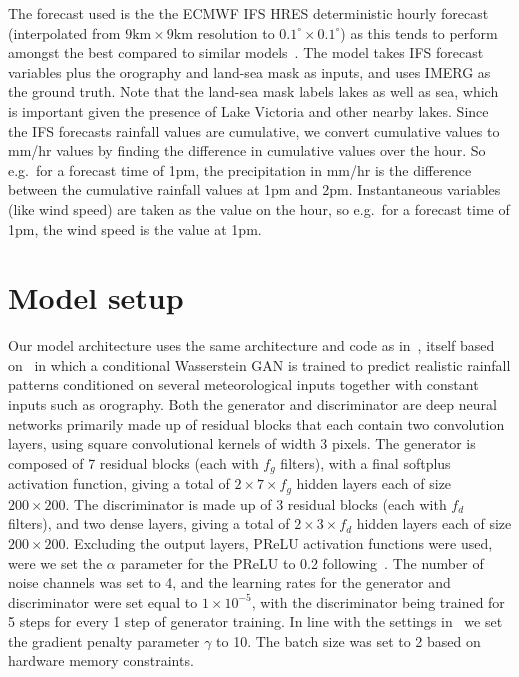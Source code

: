 \documentclass[../main.tex]{subfiles}
\begin{document}


The forecast used is the the ECMWF IFS HRES deterministic hourly forecast~\citep{ecmwf_operational_2023} (interpolated from $9\text{km} \times 9\text{km}$ resolution to $0.1^{\circ} \times 0.1^{\circ}$) as this tends to perform amongst the best compared to similar models~\citep{haiden_intercomparison_2012}. The model takes IFS forecast variables plus the orography and land-sea mask as inputs, and uses IMERG as the ground truth. Note that the land-sea mask labels lakes as well as sea, which is important given the presence of Lake Victoria and other nearby lakes. Since the IFS forecasts rainfall values are cumulative, we convert cumulative values to mm/hr values by finding the difference in cumulative values over the hour. So e.g.~for a forecast time of 1pm, the precipitation in mm/hr is the difference between the cumulative rainfall values at 1pm and 2pm. Instantaneous variables (like wind speed) are taken as the value on the hour, so e.g.~for a forecast time of 1pm, the wind speed is the value at 1pm. 




\section{Model setup}
\label{sec:model_setup}


Our model architecture uses the same architecture and code as in~\cite{harris_generative_2022}, itself based on~\cite{leinonen_stochastic_2020} in which a conditional Wasserstein GAN is trained to predict realistic rainfall patterns conditioned on several meteorological inputs together with constant inputs such as orography. Both the generator and discriminator are deep neural networks primarily made up of residual blocks that each contain two convolution layers, using square convolutional kernels of width 3 pixels. The generator is composed of 7 residual blocks (each with $f_g$ filters), with a final softplus activation function, giving a total of $2 \times 7 \times f_g$ hidden layers each of size $200 \times 200$. The discriminator is made up of 3 residual blocks (each with $f_d$ filters), and two dense layers, giving a total of $2 \times 3 \times f_d$ hidden layers each of size $200 \times 200$. 
Excluding the output layers, PReLU activation functions were used, were we set the $\alpha$ parameter for the PReLU to 0.2 following~\cite{harris_generative_2022}. The number of noise channels was set to 4, and the learning rates for the generator and discriminator were set equal to $1\times 10^{-5}$, with the discriminator being trained for 5 steps for every 1 step of generator training. In line with the settings in~\cite{gulrajani_improved_2017} we set the gradient penalty parameter $\gamma$ to 10. The batch size was set to 2 based on hardware memory constraints.
\end{document}
